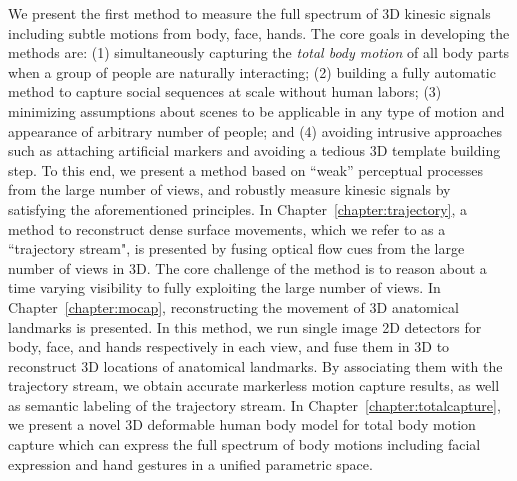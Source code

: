 We present the first method to measure the full spectrum of 3D kinesic signals including subtle motions from body, face, hands. The core goals in developing the methods are: (1) simultaneously capturing the \emph{total body motion} of all body parts when a group of people are naturally interacting; (2) building a fully automatic method to capture social sequences at scale without human labors; (3) minimizing assumptions about scenes to be applicable in any type of motion and appearance of arbitrary number of people; and (4) avoiding intrusive approaches such as attaching artificial markers and avoiding a tedious 3D template building step. To this end, we present a method based on ``weak'' perceptual processes from the large number of views, and robustly measure kinesic signals by satisfying the aforementioned principles. In Chapter~\ref{chapter:trajectory}, a method to reconstruct dense surface movements, which we refer to as a ``trajectory stream", is presented by fusing optical flow cues from the large number of views in 3D. The core challenge of the method is to reason about a time varying visibility to fully exploiting the large number of views. In Chapter~\ref{chapter:mocap}, reconstructing the movement of 3D anatomical landmarks is presented. In this method, we run single image 2D detectors for body, face, and hands respectively in each view, and fuse them in 3D to reconstruct 3D locations of anatomical landmarks. By associating them with the trajectory stream, we obtain accurate markerless motion capture results, as well as semantic labeling of the trajectory stream.  In Chapter~\ref{chapter:totalcapture}, we present a novel 3D deformable human body model for total body motion capture which can express the full spectrum of body motions including facial expression and hand gestures in a unified parametric space. 


	



